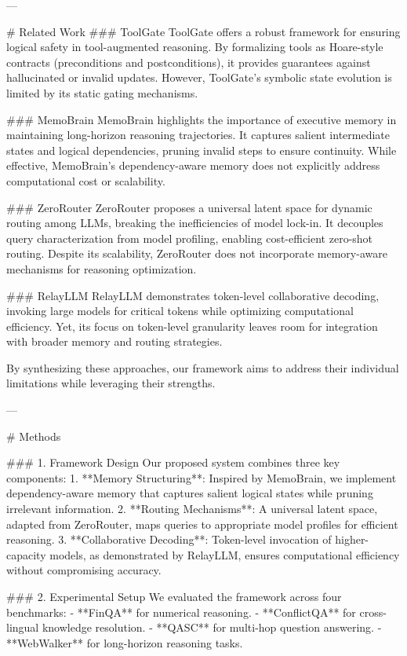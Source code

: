 ---

# Related Work  
### ToolGate  
ToolGate offers a robust framework for ensuring logical safety in tool-augmented reasoning. By formalizing tools as Hoare-style contracts (preconditions and postconditions), it provides guarantees against hallucinated or invalid updates. However, ToolGate's symbolic state evolution is limited by its static gating mechanisms.

### MemoBrain  
MemoBrain highlights the importance of executive memory in maintaining long-horizon reasoning trajectories. It captures salient intermediate states and logical dependencies, pruning invalid steps to ensure continuity. While effective, MemoBrain's dependency-aware memory does not explicitly address computational cost or scalability.

### ZeroRouter  
ZeroRouter proposes a universal latent space for dynamic routing among LLMs, breaking the inefficiencies of model lock-in. It decouples query characterization from model profiling, enabling cost-efficient zero-shot routing. Despite its scalability, ZeroRouter does not incorporate memory-aware mechanisms for reasoning optimization.

### RelayLLM  
RelayLLM demonstrates token-level collaborative decoding, invoking large models for critical tokens while optimizing computational efficiency. Yet, its focus on token-level granularity leaves room for integration with broader memory and routing strategies.

By synthesizing these approaches, our framework aims to address their individual limitations while leveraging their strengths.

---

# Methods  

### 1. Framework Design  
Our proposed system combines three key components:  
1. **Memory Structuring**: Inspired by MemoBrain, we implement dependency-aware memory that captures salient logical states while pruning irrelevant information.  
2. **Routing Mechanisms**: A universal latent space, adapted from ZeroRouter, maps queries to appropriate model profiles for efficient reasoning.  
3. **Collaborative Decoding**: Token-level invocation of higher-capacity models, as demonstrated by RelayLLM, ensures computational efficiency without compromising accuracy.  

### 2. Experimental Setup  
We evaluated the framework across four benchmarks:  
- **FinQA** for numerical reasoning.  
- **ConflictQA** for cross-lingual knowledge resolution.  
- **QASC** for multi-hop question answering.  
- **WebWalker** for long-horizon reasoning tasks.  

